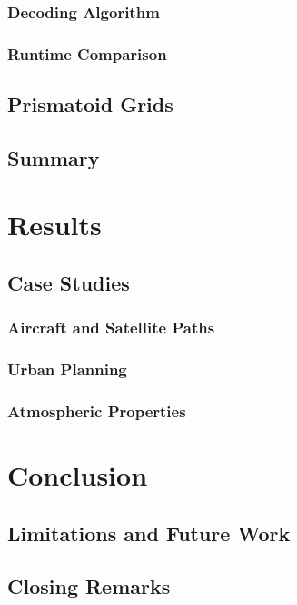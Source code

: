 \documentclass[12pt]{ucalgthes1}
\begin{document}
\subsection{Decoding Algorithm}
\subsection{Runtime Comparison}
\section{Prismatoid Grids}
\section{Summary}

\chapter{Results}
\section{Case Studies}
\subsection{Aircraft and Satellite Paths}
\subsection{Urban Planning}
\subsection{Atmospheric Properties}

\chapter{Conclusion}
\section{Limitations and Future Work}
\section{Closing Remarks}

\appendix



\nocite{*}

\end{document}

